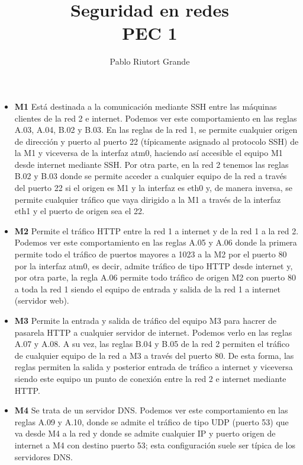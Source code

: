\documentclass[10pt,a4paper]{article}
\author{Pablo Riutort Grande}
\title{Seguridad en redes\\ \vspace{1cm}\textbf{PEC 1}}
\begin{document}
\maketitle
\vspace{3cm}
\section{}
\begin{itemize}
\item \textbf{M1} Está destinada a la comunicación mediante SSH entre las máquinas clientes de la red 2 e internet. Podemos ver este comportamiento en las reglas A.03, A.04, B.02 y B.03. En las reglas de la red 1, se permite cualquier origen de dirección y puerto al puerto 22 (típicamente asignado al protocolo SSH) de la M1 y viceversa de la interfaz atm0, haciendo así accesible el equipo M1 desde internet mediante SSH. Por otra parte, en la red 2 tenemos las reglas B.02 y B.03 donde se permite acceder a cualquier equipo de la red a través del puerto 22 si el origen es M1 y la interfaz es eth0 y, de manera inversa, se permite cualquier tráfico que vaya dirigido a la M1 a través de la interfaz eth1 y el puerto de origen sea el 22.
\item \textbf{M2} Permite el tráfico HTTP entre la red 1 a internet y de la red 1 a la red 2. Podemos ver este comportamiento en las reglas A.05 y A.06 donde la primera permite todo el tráfico de puertos mayores a 1023 a la M2 por el puerto 80 por la interfaz atm0, es decir, admite tráfico de tipo HTTP desde internet y, por otra parte, la regla A.06 permite todo tráfico de origen M2 con puerto 80 a toda la red 1 siendo el equipo de entrada y salida de la red 1 a internet (servidor web).
\item \textbf{M3} Permite la entrada y salida de tráfico del equipo M3 para hacrer de pasarela HTTP a cualquier servidor de internet. Podemos verlo en las reglas A.07 y A.08. A su vez, las reglas B.04 y B.05 de la red 2 permiten el tráfico de cualquier equipo de la red a M3 a través del puerto 80. De esta forma, las reglas permiten la salida y posterior entrada de tráfico a internet y viceversa siendo este equipo un punto de conexión entre la red 2 e internet mediante HTTP.
\item \textbf{M4} Se trata de un servidor DNS. Podemos ver este comportamiento en las reglas A.09 y A.10, donde se admite el tráfico de tipo UDP (puerto 53) que va desde M4 a la red y donde se admite cualquier IP y puerto origen de internet a M4 con destino puerto 53; esta configuración suele ser típica de los servidores DNS.\\

\end{itemize}
\end{document}
